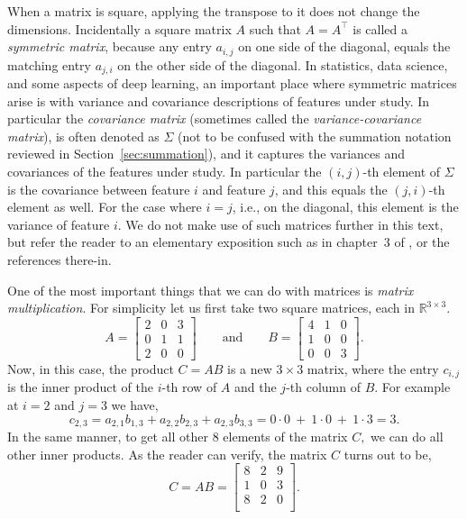 \documentclass[12pt]{article}
\begin{document}
When a matrix is square, applying the transpose to it does not change the dimensions. Incidentally a square matrix $A$ such that $A = A^\top$ is called a {\em symmetric matrix}, because any entry $a_{i,j}$ on one side of the diagonal, equals the matching entry $a_{j,i}$ on the other side of the diagonal. In statistics, data science, and some aspects of deep learning, an important place where symmetric matrices arise is with variance and covariance descriptions of features under study. In particular the {\em covariance matrix} (sometimes called the {\em variance-covariance matrix}), is often denoted as $\Sigma$ (not to be confused with the summation notation reviewed in Section~\ref{sec:summation}), and it captures the variances and covariances of the features under study. In particular the $(i,j)$-th element of $\Sigma$ is the covariance between feature $i$ and feature $j$, and this equals the $(j,i)$-th element as well. For the case where $i=j$, i.e., on the diagonal, this element is the variance of feature $i$. We do not make use of such matrices further in this text, but refer the reader to an elementary exposition such as in chapter~3 of \cite{nazarathy2020statistics}, or the references there-in.

One of the most important things that we can do with matrices is {\em matrix multiplication}. For simplicity let us first take two square matrices, each in ${\mathbb R}^{3 \times 3}$.
%
\begin{equation}
\label{eq:matrix-a-b-for-mult}
A = 
\begin{bmatrix}
2 & 0 &3 \\
0 & 1 & 1 \\
2 & 0 & 0
\end{bmatrix}
\qquad
\text{and}
\qquad
B = 
\begin{bmatrix}
4 & 1 &0 \\
1 & 0 & 0 \\
0 & 0 & 3
\end{bmatrix}.
\end{equation}
%
Now, in this case, the product $C= AB$ is a new $3 \times 3$ matrix, where the entry $c_{i,j}$ is the inner product of the $i$-th row of $A$ and the $j$-th column of $B$. For example at $i=2$ and $j=3$ we have,
\[
c_{2,3} = a_{2,1} b_{1,3} + a_{2,2} b_{2,3} + a_{2,3} b_{3,3} = 0\cdot 0 ~+~ 1\cdot 0 ~+~ 1\cdot 3 = 3.
\]
%
In the same manner, to get all other $8$ elements of the matrix $C,$ we can do all other inner products. As the reader can verify, the matrix $C$ turns out to be,
%
\begin{equation}
\label{eq:matrix-example}
C = A B = \begin{bmatrix}
8 & 2 & 9 \\
1 & 0 & 3 \\
8 & 2 & 0 \\
\end{bmatrix}.
\end{equation}
%
\end{document}
